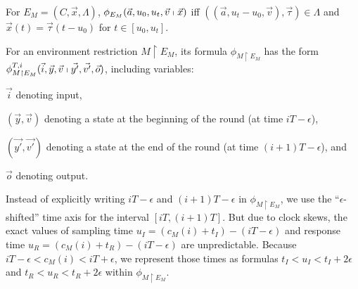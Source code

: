 \begin{definition}
For %
$E_M = (C, \vec{x}, \Lambda)$,
$\phi_{E_M}(\vec{a},u_0,u_t,\vec{v} \shortmid \vec{x})$
iff
$((\vec{a},u_t-u_0,\vec{v}), \vec{\tau}) \in \Lambda$
and $\vec{x}(t) = \vec{\tau}(t - u_0)$ for $t \in [u_0, u_t]$.
\end{definition}


For an environment restriction $M \restriction E_M$,
its formula $\phi_{M \restriction E_M}$ 
has the form
$\phi_{M \restriction E_M}^{T,i}(\vec{i}, \vec{y}, \vec{v} \shortmid \vec{y'}, \vec{v'}, \vec{o})$,
including variables:
\begin{inparaenum}[(i)]
	\item $\vec{i}$ denoting input, 
	\item $(\vec{y},\vec{v})$ denoting a state  at the beginning of the round 
		(at time $iT - \epsilon$),
	\item $(\vec{y'},\vec{v'})$ denoting a state at the end of the round 
		(at time $(i+1)T - \epsilon$), and 
	\item $\vec{o}$ denoting output.
\end{inparaenum}
%
Instead of explicitly writing $iT - \epsilon$ and $(i+1)T - \epsilon$  in $\phi_{M \restriction E_M}$,
we use the ``$\epsilon$-shifted''  time axis for the interval $[iT, (i+1)T]$. %
%
But due to clock skews, 
the exact values of sampling time $u_I = (c_M(i)+t_I)-(iT-\epsilon)$
and response time $u_R = (c_M(i)+t_R)-(iT-\epsilon)$ are unpredictable. 
Because $iT - \epsilon < c_M(i) < iT + \epsilon$,
we represent those times as formulas 
$t_I < u_I < t_I + 2\epsilon$ and $t_R < u_R < t_R + 2\epsilon$
within $\phi_{M \restriction E_M}$.






